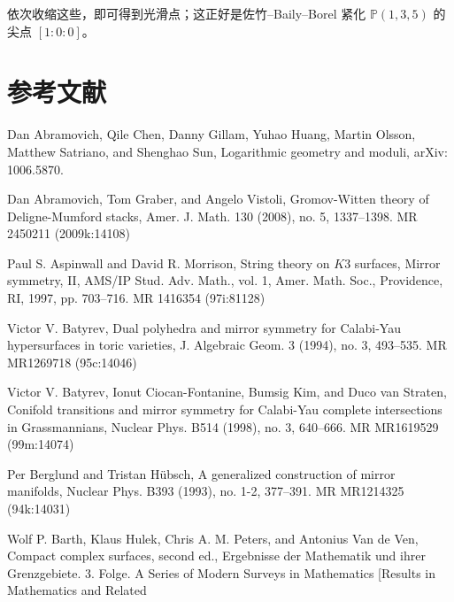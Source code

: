 

依次收缩这些，即可得到光滑点；这正好是佐竹–Baily–Borel 紧化
$\mathbb{P}(1,3,5)$ 的尖点 $[1:0:0]$。

\section*{参考文献}

\begin{list}{}{%
  \setlength{\leftmargin}{5.4em}%
  \setlength{\labelwidth}{4.8em}%
  \setlength{\labelsep}{0.6em}%
  \setlength{\itemsep}{1.5pt}%
  \setlength{\parsep}{0pt}}
\item[{[ACG$^{+}$]}] Dan Abramovich, Qile Chen, Danny Gillam, Yuhao Huang, Martin Olsson,
  Matthew Satriano, and Shenghao Sun, Logarithmic geometry and moduli, arXiv: 1006.5870.
\item[{[AGV08]}] Dan Abramovich, Tom Graber, and Angelo Vistoli, Gromov-Witten theory of
  Deligne-Mumford stacks, Amer. J. Math. 130 (2008), no. 5, 1337–1398. MR 2450211 (2009k:14108)
\item[{[AM97]}] Paul S. Aspinwall and David R. Morrison, String theory on $K3$ surfaces,
  Mirror symmetry, II, AMS/IP Stud. Adv. Math., vol. 1, Amer. Math. Soc., Providence, RI,
  1997, pp. 703–716. MR 1416354 (97i:81128)
\item[{[Bat94]}] Victor V. Batyrev, Dual polyhedra and mirror symmetry for Calabi-Yau
  hypersurfaces in toric varieties, J. Algebraic Geom. 3 (1994), no. 3, 493–535.
  MR MR1269718 (95c:14046)
\item[{[BCFKvS98]}] Victor V. Batyrev, Ionut Ciocan-Fontanine, Bumsig Kim, and Duco van
  Straten, Conifold transitions and mirror symmetry for Calabi-Yau complete intersections
  in Grassmannians, Nuclear Phys. B514 (1998), no. 3, 640–666. MR MR1619529 (99m:14074)
\item[{[BH93]}] Per Berglund and Tristan H\"ubsch, A generalized construction of mirror
  manifolds, Nuclear Phys. B393 (1993), no. 1-2, 377–391. MR MR1214325 (94k:14031)
\item[{[BHPVdV04]}] Wolf P. Barth, Klaus Hulek, Chris A. M. Peters, and Antonius Van de Ven,
  Compact complex surfaces, second ed., Ergebnisse der Mathematik und ihrer Grenzgebiete.
  3. Folge. A Series of Modern Surveys in Mathematics [Results in Mathematics and Related

\end{list}
